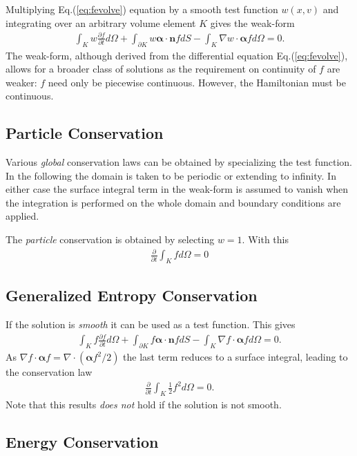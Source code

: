 \documentclass[11pt, reqno]{amsart}
\newcommand{\eqr}[1]{Eq.\thinspace(#1)}
\newcommand{\pfrac}[2]{\frac{\partial #1}{\partial #2}}
\newcommand{\pfraca}[1]{\frac{\partial}{\partial #1}}
\newcommand{\mvec}[1]{\mathbf{#1}}
\newcommand{\gvec}[1]{\boldsymbol{#1}}
\theoremstyle{definition}
\begin{document}
Multiplying \eqr{\ref{eq:fevolve}} equation by a smooth test function
$w(x,v)$ and integrating over an arbitrary volume element $K$ gives
the weak-form
\begin{align}
  \int_K w\pfrac{f}{t}d\Omega 
  + \int_{\partial K}w \gvec{\alpha}\cdot\mvec{n}f dS
  - \int_K \nabla w \cdot \gvec{\alpha} f d\Omega
 = 0.
\end{align}
The weak-form, although derived from the differential equation
\eqr{\ref{eq:fevolve}}, allows for a broader class of solutions as the
requirement on continuity of $f$ are weaker: $f$ need only be
piecewise continuous. However, the Hamiltonian must be continuous.

\subsection{Particle Conservation}

Various \emph{global} conservation laws can be obtained by
specializing the test function. In the following the domain is taken
to be periodic or extending to infinity. In either case the surface
integral term in the weak-form is assumed to vanish when the
integration is performed on the whole domain and boundary conditions
are applied.

The \emph{particle} conservation is obtained by selecting $w=1$. With
this
\begin{align}
  \pfraca{t}\int_K f d\Omega = 0
\end{align}

\subsection{Generalized Entropy Conservation}
If the solution is \emph{smooth} it can be used as a test
function. This gives
\begin{align}
  \int_K f\pfrac{f}{t}d\Omega 
  + \int_{\partial K}f \gvec{\alpha}\cdot\mvec{n}f dS
  - \int_K \nabla f \cdot \gvec{\alpha} f d\Omega
 = 0.
\end{align}
As $\nabla f \cdot \gvec{\alpha} f = \nabla\cdot (\gvec{\alpha}
f^2/2)$ the last term reduces to a surface integral, leading to the
conservation law
\begin{align}
  \pfraca{t}\int_K \frac{1}{2}f^2 d\Omega = 0.
\end{align}
Note that this results \emph{does not} hold if the solution is not
smooth.

\subsection{Energy Conservation}
\end{document}
